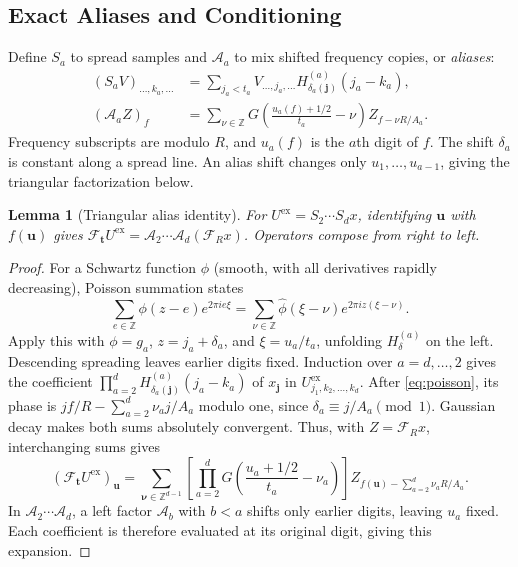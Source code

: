 \documentclass[11pt]{article}
\newtheorem{lemma}[theorem]{Lemma}
\theoremstyle{definition}
\renewcommand{\label}[1]{}%
\newcommand{\Z}{\mathbb{Z}}
\newcommand{\cA}{\mathcal{A}}
\newcommand{\cF}{\mathcal{F}}
\begin{document}
\subsection{Exact Aliases and Conditioning}\label{sec:bridge-cond}

Define $S_a$ to spread samples and $\cA_a$ to mix shifted frequency copies,
or \emph{aliases}:
\begin{align*}
 (S_aV)_{\ldots,k_a,\ldots}
 &=\sum_{j_a<t_a}V_{\ldots,j_a,\ldots}
       H_{\delta_a(\mathbf j)}^{(a)}(j_a-k_a),\\
 (\cA_aZ)_f
 &=\sum_{\nu\in\Z}
       G\left(\frac{u_a(f)+1/2}{t_a}-\nu\right)Z_{f-\nu R/A_a}.
\end{align*}
Frequency subscripts are modulo $R$, and $u_a(f)$ is the $a$th digit of $f$.
The shift $\delta_a$ is constant along a spread line.
An alias shift changes only $u_1,\ldots,u_{a-1}$, giving the triangular
factorization below.

\begin{lemma}[Triangular alias identity]\label{lem:bridge-exact}
For $U^{\mathrm{ex}}=S_2\cdots S_dx$, identifying $\mathbf u$ with $f(\mathbf u)$
gives $\cF_{\mathbf t}U^{\mathrm{ex}}=\cA_2\cdots\cA_d(\cF_Rx)$.
Operators compose from right to left.
\end{lemma}
\begin{proof}
For a Schwartz function $\phi$ (smooth, with all derivatives rapidly decreasing),
Poisson summation states
\begin{equation}\label{eq:poisson}
 \sum_{e\in\Z}\phi(z-e)e^{2\pi ie\xi}
 =\sum_{\nu\in\Z}\widehat\phi(\xi-\nu)e^{2\pi iz(\xi-\nu)}.
\end{equation}
Apply this with $\phi=g_a$, $z=j_a+\delta_a$, and $\xi=u_a/t_a$,
unfolding $H_\delta^{(a)}$ on the left.
Descending spreading leaves earlier digits fixed.
Induction over $a=d,\ldots,2$ gives the coefficient
$\prod_{a=2}^dH_{\delta_a(\mathbf j)}^{(a)}(j_a-k_a)$
of $x_{\mathbf j}$ in $U^{\mathrm{ex}}_{j_1,k_2,\ldots,k_d}$.
After \eqref{eq:poisson}, its phase is
$jf/R-\sum_{a=2}^d\nu_a j/A_a$ modulo one, since
$\delta_a\equiv j/A_a\pmod1$.
Gaussian decay makes both sums absolutely convergent.
Thus, with $Z=\cF_Rx$, interchanging sums gives
\[
 (\cF_{\mathbf t}U^{\mathrm{ex}})_{\mathbf u}
 =\sum_{\boldsymbol\nu\in\Z^{d-1}}
   \left[\prod_{a=2}^d
       G\left(\frac{u_a+1/2}{t_a}-\nu_a\right)\right]
   Z_{f(\mathbf u)-\sum_{a=2}^d\nu_aR/A_a}.
\]
In $\cA_2\cdots\cA_d$, a left factor $\cA_b$ with $b<a$ shifts only
earlier digits, leaving $u_a$ fixed.
Each coefficient is therefore evaluated at its original digit, giving this expansion.
\end{proof}
\end{document}
